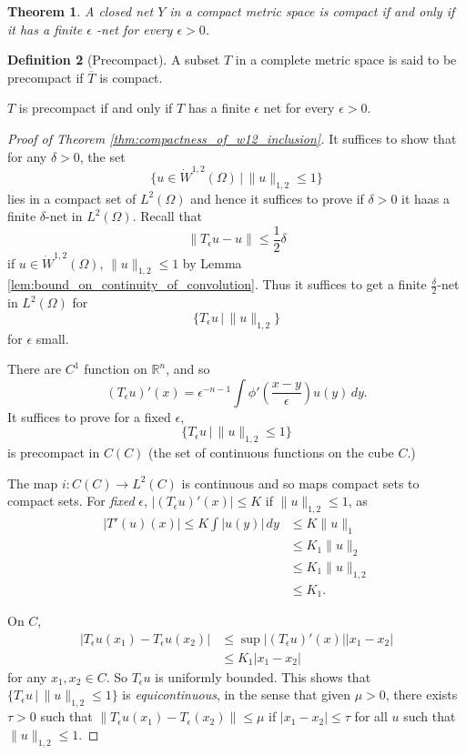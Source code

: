 \documentclass[10pt, oneside, reqno]{amsart}
\theoremstyle{plain}%
\newtheorem{thm}{Theorem}[section]
\numberwithin{equation}{section}
\theoremstyle{definition}
\newtheorem{defn}[thm]{Definition}
\theoremstyle{remark}
\newcommand{\given}{ \, | \,}
\newcommand{\R}{\mathbb{R}}
\begin{document}
\begin{thm}
	A closed net $Y$ in a compact metric space is compact if and only if it has a finite $\epsilon$ -net for every $\epsilon > 0$. 
\end{thm}

\begin{defn}[Precompact]
	A subset $T$ in a complete metric space is said to be precompact if $\overline T$ is compact.  
	
	$T$ is precompact if and only if $T$ has a finite $\epsilon$ net for every $\epsilon > 0$.
\end{defn}

\begin{proof}[Proof of Theorem \ref{thm:compactness_of_w12_inclusion}]
	It suffices to show that for any $\delta > 0$, the set \[
		\{ u \in \dot W^{1, 2}(\Omega) \given \| u \|_{1, 2} \leq 1 \}
	\]  lies in a compact set of $L^2(\Omega)$ and hence it suffices to prove if $\delta > 0$ it haas a finite $\delta$-net in $L^2(\Omega)$.   Recall that \[
		\| T_\epsilon u - u \| \leq \frac{1}{2}\delta
	\]  if $u \in \dot W^{1, 2}(\Omega)$, $\| u \|_{1, 2} \leq 1$ by Lemma \ref{lem:bound_on_continuity_of_convolution}.  Thus it suffices to get a finite $\frac{\delta}{2}$-net in $L^2(\Omega)$ for \[
		\{ T_\epsilon u \given \| u \|_{1, 2} \}
	\] for $\epsilon$ small.
	
	There are $C^1$ function on $\R^n$, and so \[
		(T_\epsilon u)' (x) = \epsilon^{-n-1} \int \phi' \left(\frac{x-y}{\epsilon} \right) u(y) \, dy.
		\tag{$\star$}
	\] It suffices to prove for a fixed $\epsilon$, \[
		\{ T_\epsilon u \given \| u \|_{1, 2} \leq 1 \}
	\] is precompact in $C(C)$ (the set of continuous functions on the cube $C$.)
	
	The map $i : C(C) \rightarrow L^2(C)$ is continuous and so maps compact sets to compact sets.  For \emph{fixed} $\epsilon$, $\left| (T_\epsilon u)' (x) \right| \leq K$ if $\| u \|_{1, 2} \leq 1$, as \begin{align*}
		|T'(u)(x)| \leq K \int |u(y) | \, dy &\leq K \| u \|_1\\
		&\leq K_1 \|u \|_2 \\
		&\leq K_1 \| u \|_{1, 2} \\
		&\leq K_1.
	\end{align*}  
	
	On $C$, 
	\begin{align*}
		|T_\epsilon u(x_1) - T_\epsilon u(x_2)| &\leq \sup |(T_\epsilon u)'(x)| |x_1 - x_2| \\
		&\leq K_1 |x_1 - x_2|
	\end{align*} for any $x_1, x_2 \in C$.  So $T_\epsilon u$ is uniformly bounded. This shows that $\{ T_\epsilon u \given \| u \|_{1, 2} \leq 1 \}$ is \emph{equicontinuous}, in the sense that given $\mu > 0$, there exists $\tau > 0$ such that $\| T_\epsilon u(x_1) - T_\epsilon(x_2) \| \leq \mu$ if $|x_1 - x_2| \leq \tau$ for all $u$ such that $\| u \|_{1, 2} \leq 1$.
	

\end{proof}
\end{document}
